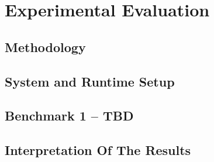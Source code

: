 \chapter{Experimental Evaluation}

\section{Methodology}

\section{System and Runtime Setup}

\section{Benchmark 1 -- TBD}

\section{Interpretation Of The Results}
